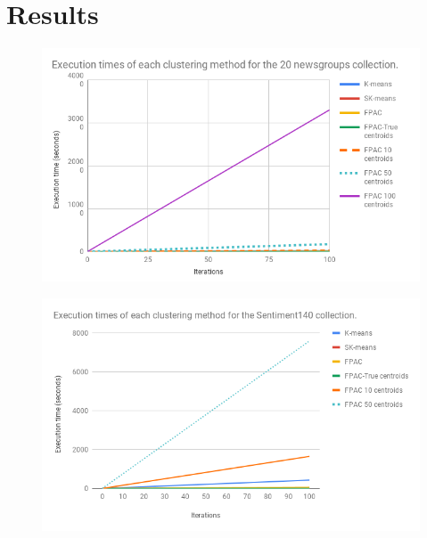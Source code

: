 \documentclass[runningheads]{llncs}
\begin{document}
%

\section{Results}


\begin{figure}
\centering
\includegraphics[scale=0.5]{graph20.png}
\end{figure}


\begin{figure}
\centering
\includegraphics[scale=0.5]{graphtweets.png}
\end{figure}
\end{document}

